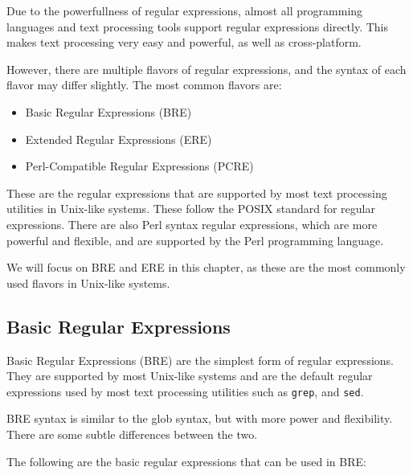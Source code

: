 Due to the powerfullness of regular expressions, almost all programming
languages and text processing tools support regular expressions directly.
This makes text processing very easy and powerful, as well as cross-platform.

However, there are multiple flavors of regular expressions, and the syntax
of each flavor may differ slightly. The most common flavors are:

\begin{itemize}
    \item Basic Regular Expressions (BRE)
    \item Extended Regular Expressions (ERE)
    \item Perl-Compatible Regular Expressions (PCRE)
\end{itemize}

These are the regular expressions that are supported by most text processing
utilities in Unix-like systems. These follow the POSIX standard for regular
expressions.
There are also Perl syntax regular expressions,
which are more powerful and flexible, and are supported by the Perl programming
language.

We will focus on BRE and ERE in this chapter, as these are the most commonly
used flavors in Unix-like systems.

\subsection{Basic Regular Expressions}

Basic Regular Expressions (BRE) are the simplest form of regular expressions.
They are supported by most Unix-like systems and are the default regular
expressions used by most text processing utilities such as \texttt{grep},
and \texttt{sed}.

BRE syntax is similar to the glob syntax, but with more power and flexibility.
There are some subtle differences between the two.

The following are the basic regular expressions that can be used in BRE:

